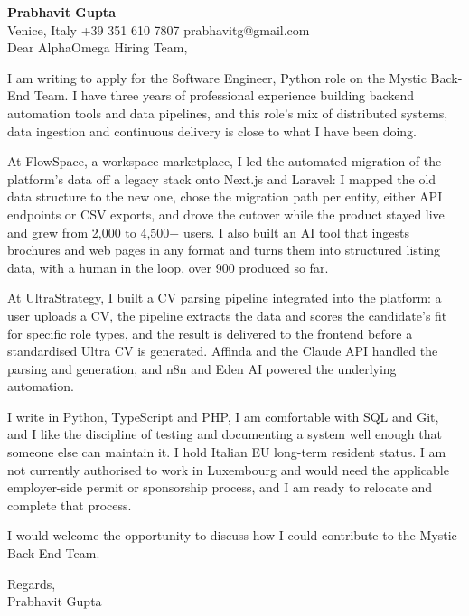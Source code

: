 \documentclass[a4paper,10.5pt]{article}
\begin{document}
\textbf{Prabhavit Gupta}\\
Venice, Italy \textbar{} +39 351 610 7807 \textbar{} prabhavitg@gmail.com\\[10pt]
Dear AlphaOmega Hiring Team,

I am writing to apply for the Software Engineer, Python role on the Mystic Back-End Team. I have three years of professional experience building backend automation tools and data pipelines, and this role's mix of distributed systems, data ingestion and continuous delivery is close to what I have been doing.

At FlowSpace, a workspace marketplace, I led the automated migration of the platform's data off a legacy stack onto Next.js and Laravel: I mapped the old data structure to the new one, chose the migration path per entity, either API endpoints or CSV exports, and drove the cutover while the product stayed live and grew from 2,000 to 4,500+ users. I also built an AI tool that ingests brochures and web pages in any format and turns them into structured listing data, with a human in the loop, over 900 produced so far.

At UltraStrategy, I built a CV parsing pipeline integrated into the platform: a user uploads a CV, the pipeline extracts the data and scores the candidate's fit for specific role types, and the result is delivered to the frontend before a standardised Ultra CV is generated. Affinda and the Claude API handled the parsing and generation, and n8n and Eden AI powered the underlying automation.

I write in Python, TypeScript and PHP, I am comfortable with SQL and Git, and I like the discipline of testing and documenting a system well enough that someone else can maintain it. I hold Italian EU long-term resident status. I am not currently authorised to work in Luxembourg and would need the applicable employer-side permit or sponsorship process, and I am ready to relocate and complete that process.

I would welcome the opportunity to discuss how I could contribute to the Mystic Back-End Team.

Regards,\\
Prabhavit Gupta
\end{document}
